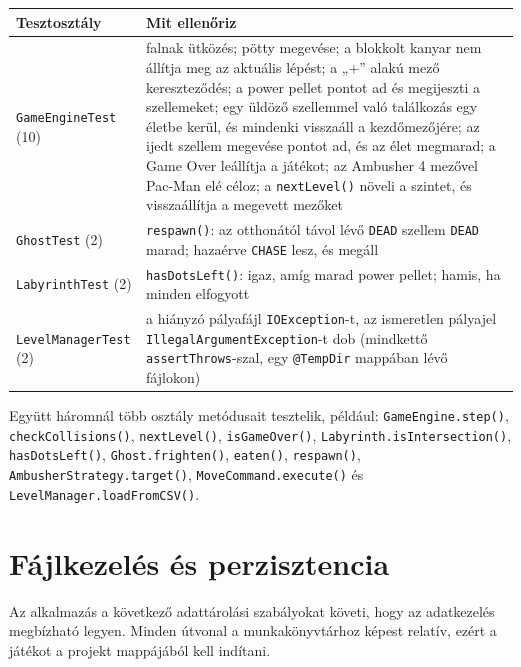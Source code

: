 \documentclass[11pt, a4paper]{article}
\begin{document}
\vspace{0.1cm}
\begin{tabular}{@{}p{3.6cm}p{11.2cm}@{}}
    \toprule
    \textbf{Tesztosztály} & \textbf{Mit ellenőriz} \\
    \midrule
    \texttt{GameEngineTest} (10) & falnak ütközés; pötty megevése; a blokkolt kanyar nem állítja meg az aktuális lépést; a „+” alakú mező kereszteződés; a power pellet pontot ad és megijeszti a szellemeket; egy üldöző szellemmel való találkozás egy életbe kerül, és mindenki visszaáll a kezdőmezőjére; az ijedt szellem megevése pontot ad, és az élet megmarad; a Game Over leállítja a játékot; az Ambusher 4 mezővel Pac-Man elé céloz; a \texttt{nextLevel()} növeli a szintet, és visszaállítja a megevett mezőket \\
    \texttt{GhostTest} (2) & \texttt{respawn()}: az otthonától távol lévő \texttt{DEAD} szellem \texttt{DEAD} marad; hazaérve \texttt{CHASE} lesz, és megáll \\
    \texttt{LabyrinthTest} (2) & \texttt{hasDotsLeft()}: igaz, amíg marad power pellet; hamis, ha minden elfogyott \\
    \texttt{LevelManagerTest} (2) & a hiányzó pályafájl \texttt{IOException}-t, az ismeretlen pályajel \texttt{IllegalArgumentException}-t dob (mindkettő \texttt{assertThrows}-szal, egy \texttt{@TempDir} mappában lévő fájlokon) \\
    \bottomrule
\end{tabular}
\vspace{0.1cm}

{\sloppy Együtt háromnál több osztály metódusait tesztelik, például: \texttt{GameEngine.step()}, \texttt{checkCollisions()}, \texttt{nextLevel()}, \texttt{isGameOver()}, \texttt{Labyrinth.isIntersection()}, \texttt{hasDotsLeft()}, \texttt{Ghost.frighten()}, \texttt{eaten()}, \texttt{respawn()}, \texttt{AmbusherStrategy.target()}, \texttt{MoveCommand.execute()} és \texttt{LevelManager.loadFromCSV()}.
\par}
\clearpage

\section{Fájlkezelés és perzisztencia}
\label{sec:io}
Az alkalmazás a következő adattárolási szabályokat követi, hogy az adatkezelés megbízható legyen. Minden útvonal a munkakönyvtárhoz képest relatív, ezért a játékot a projekt mappájából kell indítani.
\end{document}
